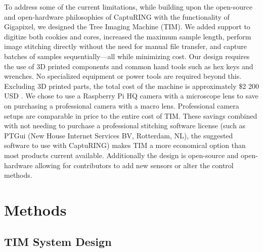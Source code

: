 \documentclass[a4paper,12pt]{article}
\begin{document}
To address some of the current limitations, while building upon the open-source and open-hardware philosophies of CaptuRING with the functionality of Gigapixel, we designed the Tree Imaging Machine (TIM).
We added support to digitize both cookies and cores, increased the maximum sample length, perform image stitching directly without the need for manual file transfer, and capture batches of samples sequentially---all while minimizing cost.
Our design requires the use of 3D printed components and common hand tools such as hex keys and wrenches. No specialized equipment or power tools are required beyond this. 
Excluding 3D printed parts, the total cost of the machine is approximately \$2 200 USD \citep[compared to the \$70 000 USD of the Gigapixel,][]{griffin_gigapixel_2021}.
We chose to use a Raspberry Pi HQ camera with a microscope lens to save on purchasing a professional camera with a macro lens. Professional camera setups are comparable in price to the entire cost of TIM.
These savings combined with not needing to purchase a professional stitching software license (such as PTGui (New House Internet Services BV, Rotterdam, NL), the suggested software to use with CaptuRING) makes TIM a more economical option than most products current available. Additionally the design is open-source and open-hardware allowing for contributors to add new sensors or alter the control methods. 

\section{Methods}

\subsection{TIM System Design} %
\end{document}
